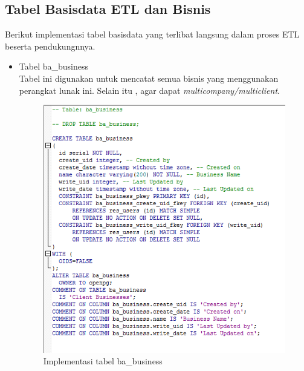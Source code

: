 \subsection{Tabel Basisdata ETL dan Bisnis}
Berikut implementasi tabel basisdata yang terlibat langsung dalam proses ETL beserta pendukungnnya.
\begin{itemize}
	\item Tabel ba\_business\\
	Tabel ini digunakan untuk mencatat semua bisnis yang menggunakan perangkat lunak ini. Selain itu , agar dapat \textit{multicompany/multiclient}.
	
	\begin{figure}[H]
	\centering
	\includegraphics[scale=0.5]{Gambar/tabel-ba-business}
	\caption{Implementasi tabel ba\_business}
	\end{figure}


\end{itemize}
